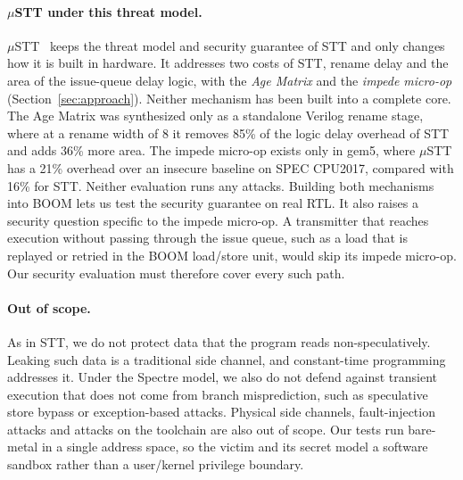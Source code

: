\paragraph{$\mu$STT under this threat model.}
$\mu$STT~\cite{Chen:uSTT:2025} keeps the threat model and security guarantee of STT and
only changes how it is built in hardware. It addresses two costs of STT, rename delay
and the area of the issue-queue delay logic, with the \emph{Age Matrix} and the
\emph{impede micro-op} (Section~\ref{sec:approach}). Neither mechanism has been built
into a complete core. The Age Matrix was synthesized only as a standalone Verilog
rename stage, where at a rename width of 8 it removes 85\% of the logic delay overhead
of STT and adds 36\% more area. The impede micro-op exists only in gem5, where $\mu$STT
has a 21\% overhead over an insecure baseline on SPEC CPU2017, compared with 16\% for
STT. Neither evaluation runs any attacks. Building both mechanisms into BOOM lets us
test the security guarantee on real RTL. It also raises a security question specific to
the impede micro-op. A transmitter that reaches execution without passing through the
issue queue, such as a load that is replayed or retried in the BOOM load/store unit,
would skip its impede micro-op. Our security evaluation must therefore cover every such
path.

\paragraph{Out of scope.}
As in STT, we do not protect data that the program reads non-speculatively. Leaking
such data is a traditional side channel, and constant-time programming addresses it.
Under the Spectre model, we also do not defend against transient execution that does
not come from branch misprediction, such as speculative store bypass or exception-based
attacks. Physical side channels, fault-injection attacks and attacks on the toolchain
are also out of scope. Our tests run bare-metal in a single address space, so the
victim and its secret model a software sandbox rather than a user/kernel privilege
boundary.
